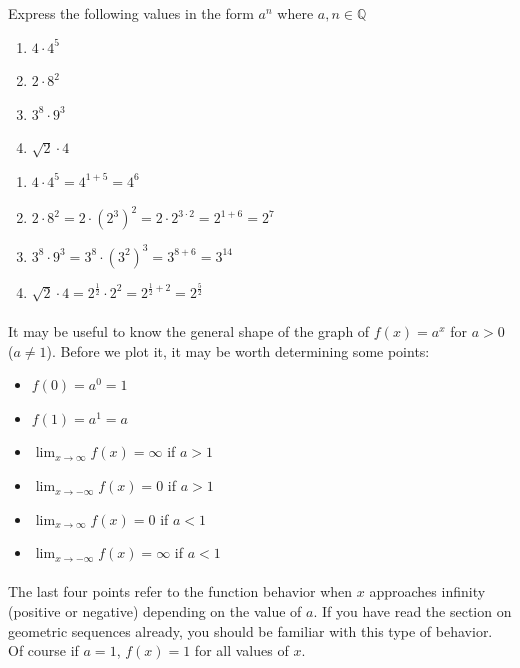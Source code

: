 \documentclass[12pt, a4paper, titlepage, twoside]{article}
\newcommand*{\Q}{\mathbb{Q}}
\newcounter{excount}[subsection]
\begin{document}
	\begin{ex}
		Express the following values in the form $a^n$ where $a, n \in \Q$
		
		\begin{enumerate}[label=\textbf{(\alph*)}]
			\item $4 \cdot 4^5$
			\item $2 \cdot 8^2$
			\item $3^8 \cdot 9^3$
			\item $\sqrt{2} \cdot 4$
		\end{enumerate}
		
		\tcbline
		
		\begin{enumerate}[label=\textbf{(\alph*)}]
			\item $4 \cdot 4^5 = 4^{1+5} = 4^6$
			\item $2 \cdot 8^2 = 2 \cdot (2^3)^2 = 2 \cdot 2^{3 \cdot 2} = 2^{1+6} = 2^7$
			\item $3^8 \cdot 9^3 = 3^8 \cdot (3^2)^3 = 3^{8+6} = 3^{14}$
			\item $\sqrt{2} \cdot 4 = 2^{\frac{1}{2}} \cdot 2^2 = 2^{\frac{1}{2} + 2} = 2^{\frac{5}{2}}$
		\end{enumerate}
	\end{ex}
	
	\paragraph{}
	It may be useful to know the general shape of the graph of $f(x) = a^x$ for $a > 0$ ($a \neq 1$). Before we plot it, it may be worth
	determining some points:
	
	\begin{itemize}
		\item $f(0) = a^0 = 1$
		\item $f(1) = a^1 = a$
		\item $\displaystyle \lim_{x \to \infty} f(x) = \infty$ if $a>1$
		\item $\displaystyle \lim_{x \to -\infty} f(x) = 0$ if $a>1$
		\item $\displaystyle \lim_{x \to \infty} f(x) = 0$ if $a<1$
		\item $\displaystyle \lim_{x \to -\infty} f(x) = \infty$ if $a<1$
	\end{itemize}
	
	\paragraph{}
	The last four points refer to the function behavior when $x$ approaches infinity (positive or negative) depending on the
	value of $a$. If you have read the section on geometric sequences already, you should be familiar with this type of behavior.
	Of course if $a = 1$, $f(x) = 1$ for all values of $x$.\\
	
\end{document}

